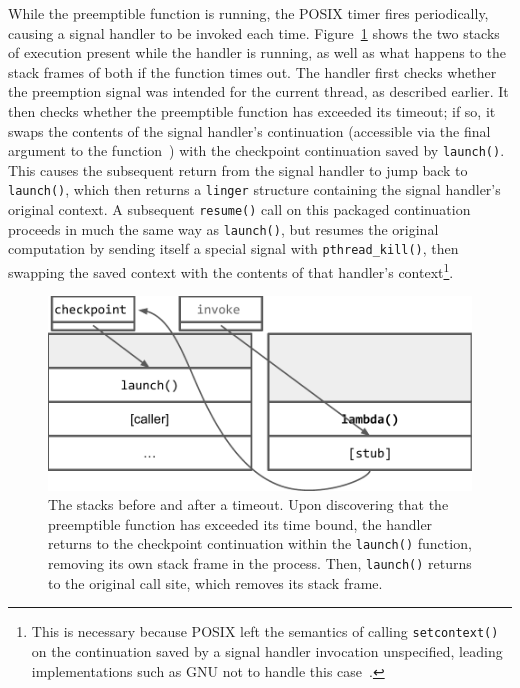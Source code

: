 While the preemptible function is running, the POSIX timer fires periodically,
causing a signal handler to be invoked each time.  Figure~\ref{fig:twostacks} shows
the two stacks of execution present while the handler is running, as well as what
happens to the stack frames of both if the function times out.  The handler first
checks whether the preemption signal was intended for the current thread, as
described earlier.  It then checks whether the preemptible function has exceeded its
timeout; if so, it swaps the contents of the signal handler's continuation
(accessible via the final argument to the function~\cite{sigaction-manpage}) with the
checkpoint continuation saved by \texttt{launch()}.  This causes the subsequent
return from the signal handler to jump back to \texttt{launch()}, which then returns
a \texttt{linger} structure containing the signal handler's original context.  A
subsequent \texttt{resume()} call on this packaged continuation proceeds in much the
same way as \texttt{launch()}, but resumes the original computation by sending itself
a special signal with \texttt{pthread\_kill()}, then swapping the saved context with
the contents of that handler's context\footnote{This is necessary because POSIX left
the semantics of calling \texttt{setcontext()} on the continuation saved by a signal
handler invocation unspecified, leading implementations such as GNU not to handle
this case~\cite{getcontext-manpage}.}.

\begin{figure}
\includegraphics[width=\columnwidth]{figs/twostacks}
\caption{The stacks before and after a timeout.  \textnormal{Upon discovering
that the preemptible function has exceeded its time bound, the handler returns to the
checkpoint continuation within the \texttt{launch()} function, removing its own stack
frame in the process.  Then, \texttt{launch()} returns to the original call site,
which removes its stack frame.}}
\label{fig:twostacks}
\end{figure}


